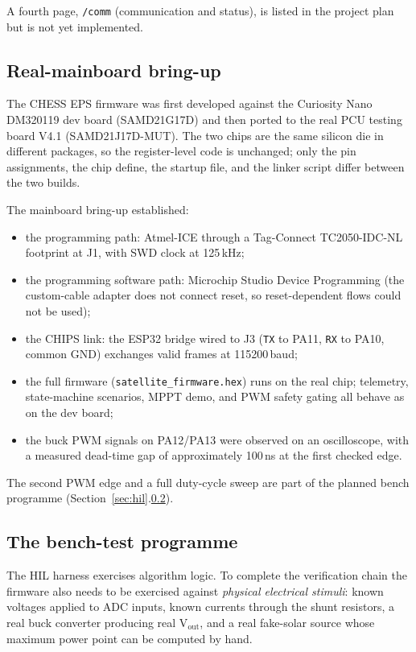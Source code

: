 A fourth page, \texttt{/comm} (communication and status), is
listed in the project plan but is not yet implemented.

\subsection{Real-mainboard bring-up}

The CHESS EPS firmware was first developed against the
Curiosity Nano DM320119 dev board (SAMD21G17D) and then ported
to the real PCU testing board V4.1 (SAMD21J17D-MUT). The two
chips are the same silicon die in different packages, so the
register-level code is unchanged; only the pin assignments,
the chip define, the startup file, and the linker script differ
between the two builds.

The mainboard bring-up established:

\begin{itemize}
\item the programming path: Atmel-ICE through a Tag-Connect
TC2050-IDC-NL footprint at J1, with SWD clock at 125\,kHz;
\item the programming software path: Microchip Studio Device
Programming (the custom-cable adapter does not connect reset,
so reset-dependent flows could not be used);
\item the CHIPS link: the ESP32 bridge wired to J3 (\texttt{TX}
to PA11, \texttt{RX} to PA10, common GND) exchanges valid
frames at 115200\,baud;
\item the full firmware (\texttt{satellite\_firmware.hex}) runs
on the real chip; telemetry, state-machine scenarios, MPPT
demo, and PWM safety gating all behave as on the dev board;
\item the buck PWM signals on PA12/PA13 were observed on an
oscilloscope, with a measured dead-time gap of approximately
100\,ns at the first checked edge.
\end{itemize}

The second PWM edge and a full duty-cycle sweep are part of the
planned bench programme (Section~\ref{sec:hil}.\ref{sec:bench-test}).

\subsection{The bench-test programme}
\label{sec:bench-test}

The HIL harness exercises algorithm logic. To complete the
verification chain the firmware also needs to be exercised
against \textit{physical electrical stimuli}: known voltages
applied to ADC inputs, known currents through the shunt
resistors, a real buck converter producing real V$_{\text{out}}$,
and a real fake-solar source whose maximum power point can be
computed by hand.

